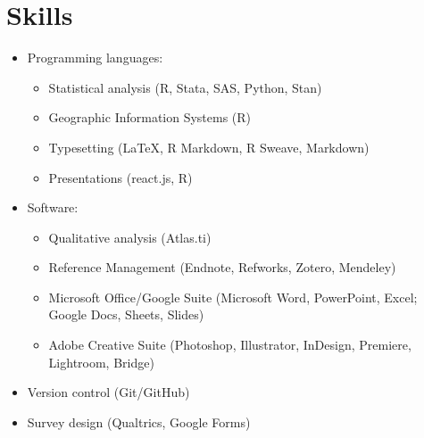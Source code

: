 \documentclass{cv_style}
\begin{document}
\section{Skills}
\begin{itemize}
    \item Programming languages: 
    \begin{itemize}
        \item Statistical analysis (R, Stata, SAS, Python, Stan)
        \item \parskip 1pt Geographic Information Systems (R)
        \item \parskip 1pt Typesetting (\LaTeX, R Markdown, R Sweave, Markdown) 
        \item \parskip 1pt Presentations (react.js, R) 
    \end{itemize}
    \item \parskip 1pt Software: 
    \begin{itemize}
        \item \parskip 1pt Qualitative analysis (Atlas.ti)
        \item \parskip 1pt Reference Management (Endnote, Refworks, Zotero, Mendeley)
        \item \parskip 1pt Microsoft Office/Google Suite (Microsoft Word, PowerPoint, Excel; Google Docs, Sheets, Slides)
        \item \parskip 1pt Adobe Creative Suite (Photoshop, Illustrator, InDesign, Premiere, Lightroom, Bridge)
    \end{itemize}
    \item \parskip 1pt Version control (Git/GitHub)
    \item \parskip 1pt Survey design (Qualtrics, Google Forms)
\end{itemize}
\end{document}
